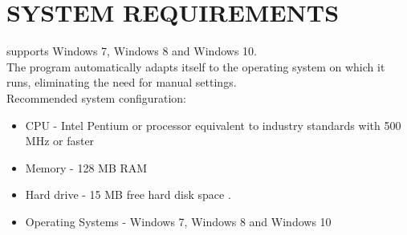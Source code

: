 \chapter{SYSTEM REQUIREMENTS} 
\thispagestyle{fancy}

\SoftwareName supports Windows 7, Windows 8 and Windows 10. \\

The program automatically adapts itself to the operating system on which it runs, eliminating the need for manual settings. \\

Recommended system configuration: \\

\begin{itemize}

	\item 	CPU - Intel Pentium or processor equivalent to industry standards with 500 MHz or faster
	\item  Memory - 128 MB RAM
	\item  Hard drive - 15 MB free hard disk space .
	\item Operating Systems - Windows 7, Windows 8 and Windows 10

\end{itemize}
